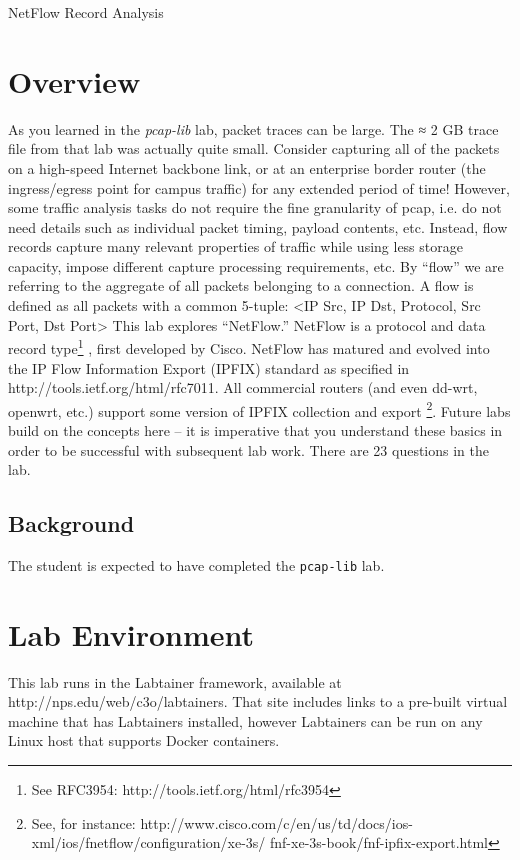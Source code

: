 


\begin{center}
{\LARGE NetFlow Record Analysis}
\vspace{0.1in}\\
\end{center}

\section{Overview}
As you learned in the \textit{pcap-lib} lab, packet traces can be large. The ≈ 2 GB trace file from that lab was actually quite small. Consider capturing all of the packets on a high-speed Internet backbone link, or at an enterprise border router (the ingress/egress point for campus traffic) for any extended period of time!
However, some traffic analysis tasks do not require the fine granularity of pcap, i.e. do not need details such as individual packet timing, payload contents, etc. Instead, flow records capture many relevant properties of traffic while using less storage capacity, impose different capture processing requirements, etc.
By “flow” we are referring to the aggregate of all packets belonging to a connection. A flow is defined as all packets with a common 5-tuple:
<IP Src, IP Dst, Protocol, Src Port, Dst Port>
This lab explores “NetFlow.” NetFlow is a protocol and data record type\footnote{See RFC3954: http://tools.ietf.org/html/rfc3954}
, first developed by Cisco. NetFlow has matured and evolved into the IP Flow Information Export (IPFIX) standard as specified in http://tools.ietf.org/html/rfc7011. All commercial routers (and even dd-wrt, openwrt, etc.) support some version of IPFIX collection and export \footnote{See, for instance: http://www.cisco.com/c/en/us/td/docs/ios-xml/ios/fnetflow/configuration/xe-3s/ fnf-xe-3s-book/fnf-ipfix-export.html}.
Future labs build on the concepts here – it is imperative that you understand these basics in order to be successful with subsequent lab work.
There are 23 questions in the lab. 

\subsection {Background}
The student is expected to have completed the {\tt pcap-lib} lab.

\section{Lab Environment}
\label{environment}
This lab runs in the Labtainer framework,
available at http://nps.edu/web/c3o/labtainers.
That site includes links to a pre-built virtual machine
that has Labtainers installed, however Labtainers can
be run on any Linux host that supports Docker containers.

